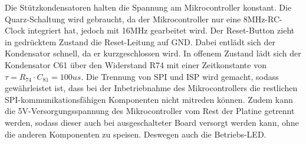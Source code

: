 Die Stützkondensatoren halten die Spannung am Mikrocontroller konstant. Die Quarz-Schaltung wird gebraucht, da der Mikrocontroller nur eine 8MHz-RC-Clock integriert hat, jedoch mit 16MHz gearbeitet wird. Der Reset-Button zieht in gedrücktem Zustand die Reset-Leitung auf GND. Dabei entlädt sich der Kondensator schnell, da er kurzgeschlossen wird. In offenem Zustand lädt sich der Kondensator C61 über den Widerstand R74 mit einer Zeitkonstante von $\tau = R_{74} \cdot C_{81} = 100us$. Die Trennung von SPI und ISP wird gemacht, sodass gewährleistet ist, dass bei der Inbetriebnahme des Mikrocontrollers die restlichen SPI-kommunikationsfähigen Komponenten nicht mitreden können. Zudem kann die 5V-Versorgungsspannung des Mikrocontroller vom Rest der Platine getrennt werden, sodass dieser auch bei ausgeschalteter Board versorgt werden kann, ohne die anderen Komponenten zu speisen. Deswegen auch die Betriebs-LED.
